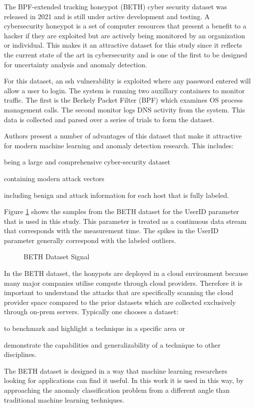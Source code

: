 The BPF-extended tracking honeypot (BETH) cyber security dataset \parencite{beth-dataset} was released in 2021 and is still under active development and testing. A cybersecurity honeypot is a set of computer resources that present a benefit to a hacker if they are exploited but are actively being monitored by an organization or individual. This makes it an attractive dataset for this study since it reflects the current state of the art in cybersecurity and is one of the first to be designed for uncertainty analysis and anomaly detection. 

For this dataset, an ssh vulnerability is exploited where any password entered will allow a user to login. The system is running two auxillary containers to monitor traffic. The first is the Berkely Packet Filter (BPF) which examines OS process management calls. The second monitor logs DNS activity from the system. This data is collected and parsed over a series of trials to form the dataset.

Authors \cite{beth-dataset} present a number of advantages of this dataset that make it attractive for modern machine learning and anomaly detection research. This includes:
\begin{inlinelist}
    \item being a large and comprehensive cyber-security dataset
    \item containing modern attack vectors
    \item including benign and attack information for each host that is fully labeled.
\end{inlinelist}

Figure \ref{fig:beth_userid_all} shows the samples from the BETH dataset for the UserID parameter that is used in this study. This parameter is treated as a continuous data stream that corresponds with the measurement time. The spikes in the UserID parameter generally correspond with the labeled outliers.

\begin{figure}[H]
    
    \caption{BETH Dataset Signal}
    \label{fig:beth_userid_all}
\end{figure}

In the BETH dataset, the honypots are deployed in a cloud environment because many major companies utilise compute through cloud providers. Therefore it is important to understand the attacks that are specifically scanning the cloud provider space compared to the prior datasets which are collected exclusively through on-prem servers. Typically one chooses a dataset:
\begin{inlinelist}
    \item to benchmark and highlight a technique in a specific area or
    \item demonstrate the capabilities and generalizability of a technique to other disciplines.
\end{inlinelist}
The BETH dataset is designed in a way that machine learning researchers looking for applications can find it useful. In this work it is used in this way, by approaching the anomaly classification problem from a different angle than traditional machine learning techniques.

